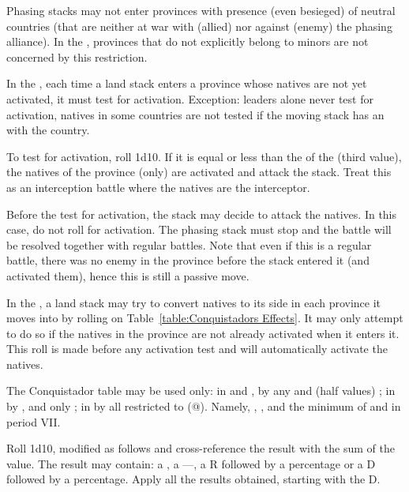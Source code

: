 Phasing stacks may not enter provinces with presence (even besieged) of
neutral countries (that are neither at war with (allied) nor against (enemy)
the phasing alliance). In the \ROTW, provinces that do not explicitly belong to
minors are not concerned by this restriction.

In the \ROTW, each time a land stack enters a province whose natives are not
yet activated, it must test for activation. Exception: leaders alone never
test for activation, natives in some \ROTW countries are not tested if the
moving stack has an \dipAT with the country.

To test for activation, roll 1d10. If it is equal or less than the
 of the \Area (third value), the natives of the province
(only) are activated and attack the stack. Treat this as an interception
battle where the natives are the interceptor.

Before the test for activation, the stack may decide to attack the natives. In
this case, do not roll for activation. The phasing stack must stop and the
battle will be resolved together with regular battles. Note that even if this
is a regular battle, there was no enemy in the province before the stack
entered it (and activated them), hence this is still a passive move.

In the \ROTW, a land stack may try to convert natives to its side in each
province it moves into by rolling on Table~\ref{table:Conquistadors
  Effects}. It may only attempt to do so if the natives in the province are
not already activated when it enters it. This roll is made before any
activation test and will automatically activate the natives.


The Conquistador table may be used only:
\bparag in  and , by any \LeaderC and
\LeaderE (half values) ;
\bparag in  by ,  and
 only ;
\bparag in  by all \LeaderC restricted to 
(@). Namely, , ,  and the minimum
\LeaderC@ of \FRA and \ANG in period VII.

Roll 1d10, modified as follows and cross-reference the result with the sum of
the \LeaderC value. The result may contain: a \textdag, a ---, a R followed by
a percentage or a D followed by a percentage. Apply all the results obtained,
starting with the D.

